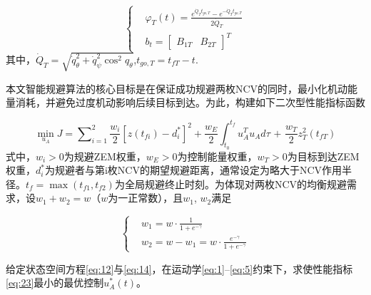 \begin{equation}
\label{eq:22}
\left\{
\begin{aligned}
& {\varphi _T}(t) = \frac{{{e^{{{\dot Q}_T}{t_{go,T}}}} - {e^{ - {{\dot Q}_T}{t_{go,T}}}}}}{{2{{\dot Q}_T}}} \\
& {b_t} = {\left[ {\begin{array}{*{20}{c}}
  {{B_{1T}}}&{{B_{2T}}}
\end{array}} \right]^T}
\end{aligned}
\right.
\end{equation}
其中，${\dot Q_T} = \sqrt {\dot q_\theta ^2 + \dot q_\psi ^2{{\cos }^2}{q_\theta }} $,${t_{go,T}} = {t_{fT}} - t$.

本文智能规避算法的核心目标是在保证成功规避两枚NCV的同时，最小化机动能量消耗，并避免过度机动影响后续目标到达。为此，构建如下二次型性能指标函数

\begin{equation}
\label{eq:23}
\mathop {\min }\limits_{{u_A}} J = \sum\nolimits_{i = 1}^2 {\frac{{{w_i}}}{2}{{\left[ {z\left( {{t_{fi}}} \right) - d_i^*} \right]}^2}}  + \frac{{{w_E}}}{2}\int_{{t_0}}^{{t_f}} {u_A^T{u_A}d\tau {\text{ + }}\frac{{{w_T}}}{2}z_T^2\left( {{t_{fT}}} \right)}
\end{equation}
式中，${w_i} > 0$为规避ZEM权重，${w_E} > 0$为控制能量权重，${w_T} > 0$为目标到达ZEM权重，$d_i^*$为规避者与第i枚NCV的期望规避距离，通常设定为略大于NCV作用半径。${t_f} = \max ({t_{f1}},{t_{f2}})$为全局规避终止时刻。为体现对两枚NCV的均衡规避需求，设${w_1} + {w_2} = w$（$w$为一正常数），且${w_1}$, ${w_2}$满足

\begin{equation}
\label{eq:24}
\left\{
\begin{aligned}
& {w_1} = w \cdot \frac{1}{{1 + {e^{ - \gamma }}}} \\
& {w_2} = w - {w_1} = w \cdot \frac{{{e^{ - \gamma }}}}{{1 + {e^{ - \gamma }}}}
\end{aligned}
\right.
\end{equation}
\begin{problem}[一体化最优规避与制导]
给定状态空间方程\eqref{eq:12}与\eqref{eq:14}，在运动学\eqref{eq:1}–\eqref{eq:5}约束下，求使性能指标\eqref{eq:23}最小的最优控制$u_A^*(t)$。
\end{problem}
